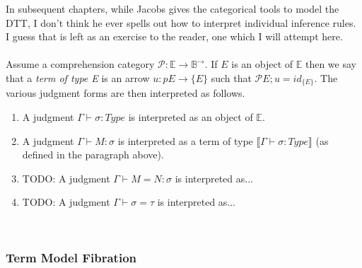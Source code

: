 \documentclass{article}
\newcommand{\sem}[1]{\llbracket #1 \rrbracket}
\begin{document}
In subsequent chapters, while Jacobs gives the categorical tools to model the DTT, I don't think he ever spells out how 
to interpret individual inference rules. I guess that is left as an exercise to the reader, one which I will attempt here.\\~\\
Assume a comprehension category $\mathcal P : \mathbb E \to \mathbb B^{\to}$. If $E$ is an object of $\mathbb E$ then we 
say that a \emph{term of type E} is an arrow $u : pE \to \{ E \}$ such that $\mathcal PE;u = \mathit{id}_{\{ E \}}$. The
various judgment forms are then interpreted as follows.
\begin{enumerate}
\item A judgment $\Gamma \vdash \sigma : \mathit{Type}$ is interpreted as an object of $\mathbb E$.
\item A judgment $\Gamma \vdash M : \sigma$ is interpreted as a term of type $\sem{\Gamma \vdash \sigma : \mathit{Type}}$
 (as defined in the paragraph above).
\item TODO: A judgment $\Gamma \vdash M = N : \sigma$ is interpreted as...
\item TODO: A judgment $\Gamma \vdash \sigma = \tau$ is interpreted as...
\end{enumerate}~\\

\subsubsection*{Term Model Fibration}
\end{document}
